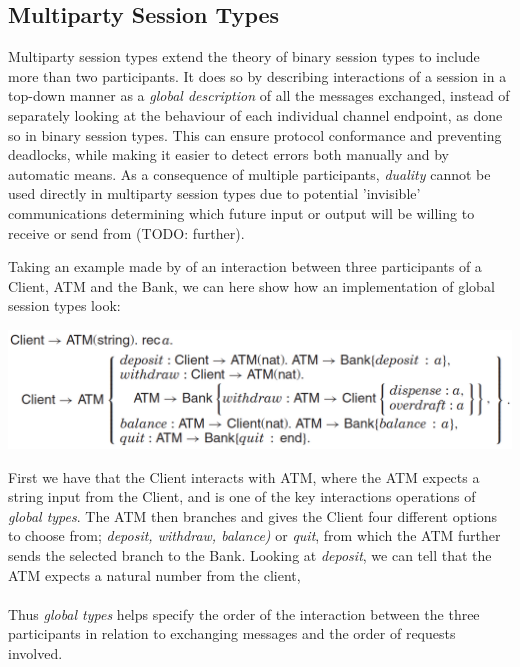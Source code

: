 
\subsection{Multiparty Session Types}
Multiparty session types extend the theory of binary session types to include more than two participants. It does so by describing interactions of a session in a top-down manner as a \textit{global description} of all the messages exchanged, instead of separately looking at the behaviour of each individual channel endpoint, as done so in binary session types. This can ensure protocol conformance and preventing deadlocks, while making it easier to detect errors both manually and by automatic means. As a consequence of multiple participants, \textit{duality} cannot be used directly in multiparty session types due to potential 'invisible' communications determining which future input or output will be willing to receive or send from (TODO: further).  %

Taking an example made by \citeauthor{DBLP:journals/csur/HuttelLVCCDMPRT16} of an interaction between three participants of a Client, ATM and the Bank, we can here show how an implementation of global session types look:
\begin{center}
\includegraphics[width=1.0\textwidth, angle=0]{Graphics/Client_ATM.pdf}
\end{center}
First we have that the Client interacts with ATM, where the ATM expects a string input from the Client, and is one of the key interactions operations of \textit{global types}. The ATM then branches and gives the Client four different options to choose from; \textit{deposit, withdraw, balance)} or \textit{quit}, from which the ATM further sends the selected branch to the Bank. Looking at \textit{deposit}, we can tell that the ATM expects a natural number from the client, 
\\ \\
Thus \textit{global types} helps specify the order of the interaction between the three participants in relation to exchanging messages and the order of requests involved.  

